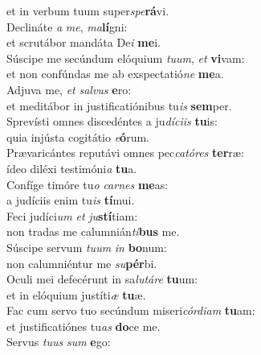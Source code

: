\evenverse et in verbum tuum super\textit{spe}\textbf{rá}vi.\\
\oddverse Declináte \textit{a} \textit{me}, \textit{ma}\textbf{lí}gni:~\*\\
\oddverse et scrutábor mandáta De\textit{i} \textbf{me}i.\\
\evenverse Súscipe me secúndum elóquium \textit{tu}\textit{um}, \textit{et} \textbf{vi}vam:~\*\\
\evenverse et non confúndas me ab exspectatió\textit{ne} \textbf{me}a.\\
\oddverse Adjuva me, \textit{et} \textit{sal}\textit{vus} \textbf{e}ro:~\*\\
\oddverse et meditábor in justificatiónibus tu\textit{is} \textbf{sem}per.\\
\evenverse Sprevísti omnes discedéntes a ju\textit{dí}\textit{ci}\textit{is} \textbf{tu}is:~\*\\
\evenverse quia injústa cogitátio \textit{e}\textbf{ó}rum.\\
\oddverse Prævaricántes reputávi omnes pec\textit{ca}\textit{tó}\textit{res} \textbf{ter}ræ:~\*\\
\oddverse ídeo diléxi testimóni\textit{a} \textbf{tu}a.\\
\evenverse Confíge timóre tu\textit{o} \textit{car}\textit{nes} \textbf{me}as:~\*\\
\evenverse a judíciis enim tu\textit{is} \textbf{tí}mui.\\
\oddverse Feci judíci\textit{um} \textit{et} \textit{ju}\textbf{stí}tiam:~\*\\
\oddverse non tradas me calumnián\textit{ti}\textbf{bus} me.\\
\evenverse Súscipe servum \textit{tu}\textit{um} \textit{in} \textbf{bo}num:~\*\\
\evenverse non calumniéntur me \textit{su}\textbf{pér}bi.\\
\oddverse Oculi mei defecérunt in sa\textit{lu}\textit{tá}\textit{re} \textbf{tu}um:~\*\\
\oddverse et in elóquium justíti\textit{æ} \textbf{tu}æ.\\
\evenverse Fac cum servo tuo secúndum miseri\textit{cór}\textit{di}\textit{am} \textbf{tu}am:~\*\\
\evenverse et justificatiónes tu\textit{as} \textbf{do}ce me.\\
\oddverse Servus \textit{tu}\textit{us} \textit{sum} \textbf{e}go:~\*\\
